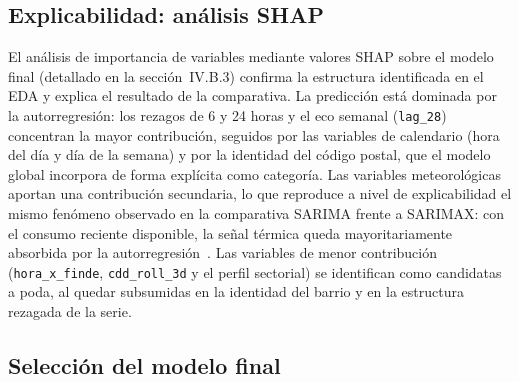 \documentclass[12pt, a4paper]{article}
\begin{document}
\subsection{Explicabilidad: análisis SHAP}

El análisis de importancia de variables mediante valores SHAP sobre el modelo final (detallado en la sección~IV.B.3) confirma la estructura identificada en el EDA y explica el resultado de la comparativa. La predicción está dominada por la autorregresión: los rezagos de 6 y 24 horas y el eco semanal (\texttt{lag\_28}) concentran la mayor contribución, seguidos por las variables de calendario (hora del día y día de la semana) y por la identidad del código postal, que el modelo global incorpora de forma explícita como categoría. Las variables meteorológicas aportan una contribución secundaria, lo que reproduce a nivel de explicabilidad el mismo fenómeno observado en la comparativa SARIMA frente a SARIMAX: con el consumo reciente disponible, la señal térmica queda mayoritariamente absorbida por la autorregresión~\cite{pardo2002}. Las variables de menor contribución (\texttt{hora\_x\_finde}, \texttt{cdd\_roll\_3d} y el perfil sectorial) se identifican como candidatas a poda, al quedar subsumidas en la identidad del barrio y en la estructura rezagada de la serie.

\subsection{Selección del modelo final}
\end{document}
